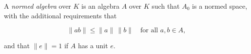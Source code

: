A \emph{normed algebra} over $K$ is an algebra $A$ over $K$ such that $A_0$ is a normed space, with the additional requirements that

$$\|ab\| \leq \|a\| \, \|b\| \quad \text{for all } a, b \in A,$$

and that $\|e\| = 1$ if $A$ has a unit $e$.

